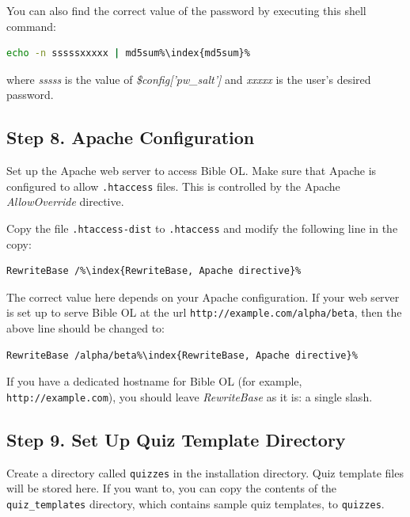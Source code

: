 \documentclass[11pt,oneside,a4paper]{memoir}
\newcommand{\q}{{\mainnolig '}}
\begin{document}
You can also find the correct value of the password by executing this shell command:

\begin{lstlisting}[language=bash]
echo -n sssssxxxxx | md5sum%\index{md5sum}%
\end{lstlisting}

\noindent
where \emph{sssss} is the value of \emph{\$config[\q pw\_salt\q]} and \emph{xxxxx} is the user's
desired password.


\subsection{Step 8. Apache Configuration}

Set up the Apache web server to access Bible OL. Make sure that Apache is configured to allow
\texttt{.htaccess} files. This is controlled by the Apache
\emph{AllowOverride} directive.

Copy the file \texttt{.htaccess-dist} to \texttt{.htaccess} and modify the following line in the
copy:

\begin{lstlisting}
RewriteBase /%\index{RewriteBase, Apache directive}%
\end{lstlisting}

The correct value here depends on your Apache configuration. If your web server is set up to serve
Bible OL at the url \texttt{http://example.com/alpha/beta}, then the above line should be changed to:

\begin{lstlisting}
RewriteBase /alpha/beta%\index{RewriteBase, Apache directive}%
\end{lstlisting}

If you have a dedicated hostname for Bible OL (for example, \texttt{http://example.com}), you should
leave \emph{RewriteBase} as it is: a single slash.

\subsection{Step 9. Set Up Quiz Template Directory}

Create a directory called \texttt{quizzes} in the installation directory. Quiz template files will
be stored here. If you want to, you can copy the contents of the \texttt{quiz\_templates} directory,
which contains sample quiz templates, to \texttt{quizzes}.
\end{document}
